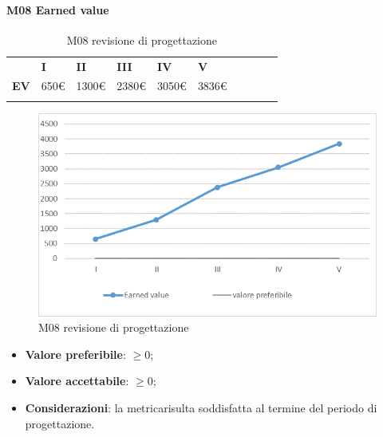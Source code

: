 \paragraph{M08 Earned value} \mbox{}
\begin{longtable}[H!] {						
		>{}p{38mm}  		
		>{}p{12mm}
		>{}p{12mm}		
		>{}p{12mm}		
		>{}p{12mm}		
		>{}p{12mm}		
		>{}p{12mm}
		>{}p{12mm}
		>{}p{12mm}
		>{}p{12mm}
	}
	\rowcolor{gray!50}
	\textbf{} & \textbf{I} & \textbf{II} & \textbf{III} & \textbf{IV} & \textbf{V} \TBstrut \\ [2mm]
	\textbf{EV} & 650\euro & 1300\euro & 2380\euro & 3050\euro & 3836\euro \TBstrut \\ [2mm]
	\rowcolor{white}
	\caption{M08 revisione di progettazione\glo}
\end{longtable}
\begin{figure}[H] 	
\includegraphics[width=\linewidth]{./img/grafici/RP5.png}	
\caption{M08 revisione di progettazione\glo}	
\end{figure}
\begin{itemize}
	\item \textbf{Valore preferibile}: $\ge0$;
	\item \textbf{Valore accettabile}: $\ge0$;
	\item \textbf{Considerazioni}: la metrica\glosp risulta soddisfatta al termine del periodo di progettazione\glo.
\end{itemize}
